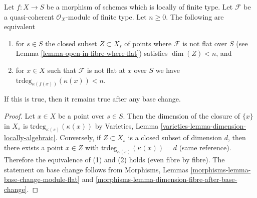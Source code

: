 \begin{lemma}
\label{lemma-pre-flat-dimension-n}
Let $f : X \to S$ be a morphism of schemes which is locally of finite type.
Let $\mathcal{F}$ be a quasi-coherent $\mathcal{O}_X$-module of finite
type. Let $n \geq 0$. The following are equivalent
\begin{enumerate}
\item for $s \in S$ the closed subset $Z \subset X_s$ of points
where $\mathcal{F}$ is not flat over $S$ (see
Lemma \ref{lemma-open-in-fibre-where-flat})
satisfies $\dim(Z) < n$, and
\item for $x \in X$ such that $\mathcal{F}$ is not flat at $x$
over $S$ we have $\text{trdeg}_{\kappa(f(x))}(\kappa(x)) < n$.
\end{enumerate}
If this is true, then it remains true after any base change.
\end{lemma}

\begin{proof}
Let $x \in X$ be a point over $s \in S$.
Then the dimension of the closure of $\{x\}$ in $X_s$
is $\text{trdeg}_{\kappa(s)}(\kappa(x))$ by
Varieties, Lemma \ref{varieties-lemma-dimension-locally-algebraic}.
Conversely, if $Z \subset X_s$ is a closed subset
of dimension $d$, then there exists a point $x \in Z$
with $\text{trdeg}_{\kappa(s)}(\kappa(x)) = d$ (same reference).
Therefore the equivalence of (1) and (2) holds (even fibre by fibre).
The statement on base change follows from
Morphisms, Lemmas \ref{morphisms-lemma-base-change-module-flat} and
\ref{morphisms-lemma-dimension-fibre-after-base-change}.
\end{proof}

